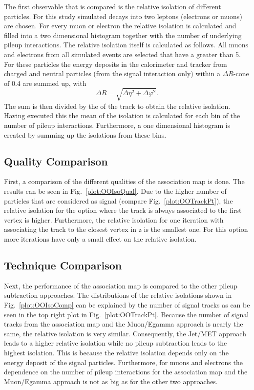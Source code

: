 The first observable that is compared is the relative isolation of different particles. For this study simulated \Zz{} decays into two leptons (electrons or muons) are chosen. For every muon or electron the relative isolation is calculated and filled into a two dimensional histogram together with the number of underlying pileup interactions.  The relative isolation itself is calculated as follows. All muons and electrons from all simulated events are selected that have a \pt greater than 5\GeV. For these particles the energy deposits in the calorimeter and tracker from charged and neutral particles (from the signal interaction only) within a $\Delta{}R$-cone of 0.4 are summed up, with
\begin{equation}
\Delta{}R = \sqrt{\Delta{}\eta{}^{2} + \Delta{}\varphi{}^{2}}.
\label{eq:OODeltaR}
\end{equation}
The sum is then divided by the \pt of the track to obtain the relative isolation. Having executed this the mean of the isolation is calculated for each bin of the number of pileup interactions. Furthermore, a one dimensional histogram is created by summing up the isolations from these bins.

\subsection{Quality Comparison \label{sec:OOIsoQual}}

First, a comparison of the different qualities of the association map is done. The results can be seen in Fig.~\ref{plot:OOIsoQual}. Due to the higher number of particles that are considered as signal (compare Fig.~\ref{plot:OOTrackPt}), the relative isolation for the option where the track is always associated to the first vertex is higher. Furthermore, the relative isolation for one iteration with associating the track to the closest vertex in z is the smallest one. For this option more iterations have only a small effect on the relative isolation.

\subsection{Technique Comparison \label{sec:OOIsoComp}}

Next, the performance of the association map is compared to the other pileup subtraction approaches. The distributions of the relative isolations shown in Fig.~\ref{plot:OOIsoComp} can be explained by the number of signal tracks as can be seen in the top right plot in Fig.~\ref{plot:OOTrackPt}. Because the number of signal tracks from the association map and the Muon/Egamma approach is nearly the same, the relative isolation is very similar. Consequently, the Jet/MET approach leads to a higher relative isolation while no pileup subtraction leads to the highest isolation. This is because the relative isolation depends only on the energy deposit of the signal particles. Furthermore, for muons and electrons the dependence on the number of pileup interactions for the association map and the Muon/Egamma approach is not as big as for the other two approaches.

